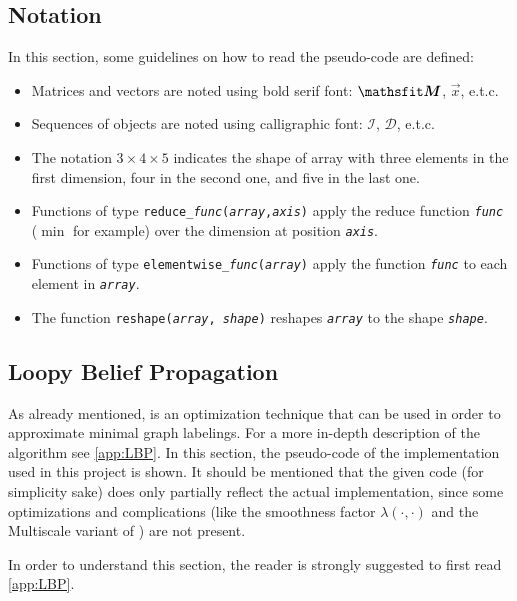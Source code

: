 \subsection{Notation}
In this section, some guidelines on how to read the pseudo-code are defined:
\begin{itemize}
	\item Matrices and vectors are noted using bold serif font: $\mat M$,  $\vec x$, e.t.c.
	\item Sequences of objects are noted using calligraphic font:  $\mathcal{I}$, $\mathcal{D}$, e.t.c.
	\item The notation $3\times 4 \times 5$ indicates the shape of array with three elements in the first dimension, four in the second one, and five in the last one.
	\item Functions of type \texttt{reduce\_\textit{func}(\textit{array},\textit{axis})} apply the reduce function \texttt{\textit{func}} ($\min$ for example) over the dimension at position \texttt{\textit{axis}}.
	\item Functions of type \texttt{elementwise\_\textit{func}(\texttt{\textit{array}})} apply the function \texttt{\textit{func}} to each element in \texttt{\textit{array}}.
	\item The function \texttt{reshape(\textit{array}, \textit{shape})} reshapes \texttt{\textit{array}} to the shape \texttt{\textit{shape}}.
\end{itemize}


\subsection{Loopy Belief Propagation}
As already mentioned, \LBP{} is an optimization technique that can be used in order to approximate minimal graph labelings. For a more in-depth description of the algorithm see \cref{app:LBP}. In this section, the pseudo-code of the implementation used in this project is shown. It should be mentioned that the given code (for simplicity sake) does only partially  reflect the actual implementation, since some optimizations and complications (like the smoothness factor $\lambda(\cdot,\cdot)$ and the Multiscale variant of \LBP{}) are not present.\\
\begin{Note}
	In order to understand this section, the reader is strongly suggested to  first read \cref{app:LBP}.
\end{Note}

